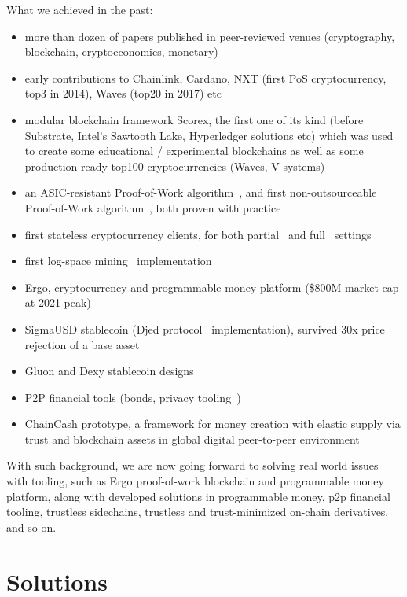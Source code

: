 \documentclass{llncs}   %
\begin{document}
What we achieved in the past:
\begin{itemize}
  \item  more than dozen of papers published in peer-reviewed venues (cryptography, blockchain, cryptoeconomics, monetary)
  \item  early contributions to Chainlink, Cardano, NXT (first PoS cryptocurrency, top3 in 2014), Waves (top20 in 2017) etc
  \item  modular blockchain framework Scorex, the first one of its kind (before Substrate, Intel's Sawtooth Lake, Hyperledger solutions etc) which was used to
create some educational / experimental blockchains as well as some production ready top100 cryptocurrencies (Waves, V-systems)
  \item  an ASIC-resistant Proof-of-Work algorithm~\cite{autolykos}, and first non-outsourceable Proof-of-Work algorithm~\cite{autolykos}, both proven with practice
  \item  first stateless cryptocurrency clients, for both partial~\cite{reyzin2017improving} and full~\cite{chepurnoy2018edrax} settings
  \item  first log-space mining~\cite{kiayias2021mining} implementation
  \item  Ergo, cryptocurrency and programmable money platform (\$800M market cap at 2021 peak)
  \item  SigmaUSD stablecoin (Djed protocol~\cite{zahnentferner2021djed} implementation), survived 30x price rejection of a base asset
  \item  Gluon and Dexy stablecoin designs
  \item  P2P financial tools (bonds, privacy tooling~\cite{chepurnoy2020zerojoin})
  \item  ChainCash prototype, a framework for money creation with elastic supply via trust and blockchain assets in
  global digital peer-to-peer environment~\cite{chaincash}
\end{itemize}

With such background, we are now going forward to solving real world issues with tooling, such as Ergo proof-of-work blockchain and programmable money platform, along with developed solutions in programmable money,
p2p financial tooling, trustless sidechains, trustless and trust-minimized on-chain derivatives, and so on.

\section{Solutions}
\label{sec-solutions}
\end{document}
